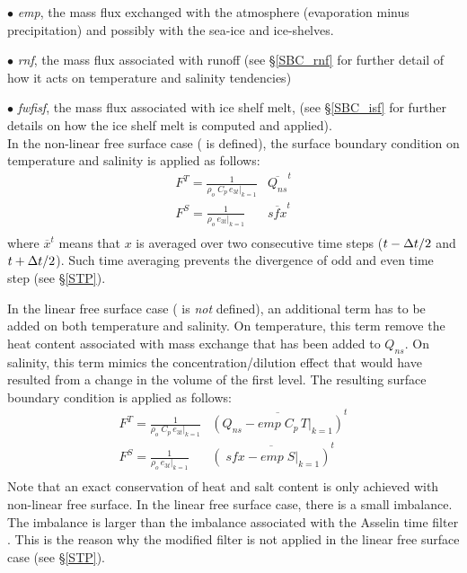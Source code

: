 \documentclass[NEMO_book]{subfiles}
\begin{document}
$\bullet$ \textit{emp}, the mass flux exchanged with the atmosphere (evaporation minus precipitation) 
 and possibly with the sea-ice and ice-shelves.

$\bullet$ \textit{rnf}, the mass flux associated with runoff 
(see \S\ref{SBC_rnf} for further detail of how it acts on temperature and salinity tendencies)

$\bullet$ \textit{fwfisf}, the mass flux associated with ice shelf melt, (see \S\ref{SBC_isf} for further details 
on how the ice shelf melt is computed and applied).\\

In the non-linear free surface case ( is defined), the surface boundary condition 
on temperature and salinity is applied as follows:
\begin{equation} \label{Eq_tra_sbc}
\begin{aligned}
 &F^T = \frac{ 1 }{\rho _o \;C_p \,\left. e_{3t} \right|_{k=1} }  &\overline{ Q_{ns}       }^t  & \\ 
& F^S =\frac{ 1 }{\rho _o  \,      \left. e_{3t} \right|_{k=1} }  &\overline{ \textit{sfx} }^t   & \\   
 \end{aligned}
\end{equation} 
where $\overline{x }^t$ means that $x$ is averaged over two consecutive time steps 
($t-\Delta t/2$ and $t+\Delta t/2$). Such time averaging prevents the 
divergence of odd and even time step (see \S\ref{STP}).

In the linear free surface case ( is \textit{not} defined), 
an additional term has to be added on both temperature and salinity. 
On temperature, this term remove the heat content associated with mass exchange
that has been added to $Q_{ns}$. On salinity, this term mimics the concentration/dilution effect that
would have resulted from a change in the volume of the first level.
The resulting surface boundary condition is applied as follows:
\begin{equation} \label{Eq_tra_sbc_lin}
\begin{aligned}
 &F^T = \frac{ 1 }{\rho _o \;C_p \,\left. e_{3t} \right|_{k=1} }   
           &\overline{ \left( Q_{ns} - \textit{emp}\;C_p\,\left. T \right|_{k=1} \right) }^t  & \\ 
%
& F^S =\frac{ 1 }{\rho _o \,\left. e_{3t} \right|_{k=1} } 
           &\overline{ \left( \;\textit{sfx} - \textit{emp} \;\left. S \right|_{k=1}  \right) }^t   & \\   
 \end{aligned}
\end{equation} 
Note that an exact conservation of heat and salt content is only achieved with non-linear free surface. 
In the linear free surface case, there is a small imbalance. The imbalance is larger 
than the imbalance associated with the Asselin time filter \citep{Leclair_Madec_OM09}. 
This is the reason why the modified filter is not applied in the linear free surface case (see \S\ref{STP}).
\end{document}
